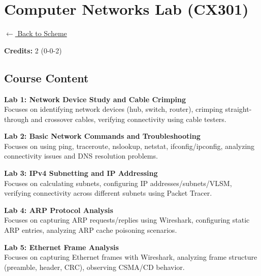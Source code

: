 \section*{Computer Networks Lab (CX301)}
\label{course:CX301}

\noindent \small{\hyperref[main:scheme]{$\leftarrow$ Back to Scheme}} \vspace{0.5cm}

\noindent \textbf{Credits:} 2 (0-0-2)

\subsection*{Course Content}
\noindent\textbf{Lab 1: Network Device Study and Cable Crimping} \\
Focuses on identifying network devices (hub, switch, router), crimping straight-through and crossover cables, verifying connectivity using cable testers.

\vspace{0.2cm}

\noindent\textbf{Lab 2: Basic Network Commands and Troubleshooting} \\
Focuses on using ping, traceroute, nslookup, netstat, ifconfig/ipconfig, analyzing connectivity issues and DNS resolution problems.

\vspace{0.2cm}

\noindent\textbf{Lab 3: IPv4 Subnetting and IP Addressing} \\
Focuses on calculating subnets, configuring IP addresses/subnets/VLSM, verifying connectivity across different subnets using Packet Tracer.

\vspace{0.2cm}

\noindent\textbf{Lab 4: ARP Protocol Analysis} \\
Focuses on capturing ARP requests/replies using Wireshark, configuring static ARP entries, analyzing ARP cache poisoning scenarios.

\vspace{0.2cm}

\noindent\textbf{Lab 5: Ethernet Frame Analysis} \\
Focuses on capturing Ethernet frames with Wireshark, analyzing frame structure (preamble, header, CRC), observing CSMA/CD behavior.

\vspace{0.2cm}

